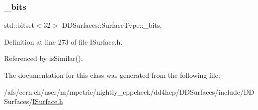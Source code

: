 \subsubsection{\texorpdfstring{\+\_\+bits}{\_bits}}
{\footnotesize\ttfamily std\+::bitset$<$32$>$ D\+D\+Surfaces\+::\+Surface\+Type\+::\+\_\+bits\hspace{0.3cm}{\ttfamily [mutable]}, {\ttfamily [protected]}}



Definition at line 273 of file I\+Surface.\+h.



Referenced by is\+Similar().



The documentation for this class was generated from the following file\+:\begin{DoxyCompactItemize}
\item 
/afs/cern.\+ch/user/m/mpetric/nightly\+\_\+cppcheck/dd4hep/\+D\+D\+Surfaces/include/\+D\+D\+Surfaces/\hyperlink{_i_surface_8h}{I\+Surface.\+h}\end{DoxyCompactItemize}
